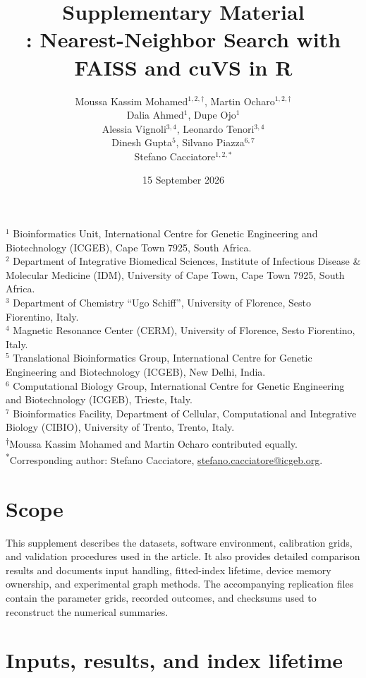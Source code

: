 \documentclass[11pt]{article}
\title{\textbf{Supplementary Material}\\[0.4em]
\large \pkg{faissR}: Nearest-Neighbor Search with FAISS and cuVS in R}
\author{Moussa Kassim Mohamed$^{1,2,\dagger}$, Martin Ocharo$^{1,2,\dagger}$\\
Dalia Ahmed$^{1}$, Dupe Ojo$^{1}$\\
Alessia Vignoli$^{3,4}$, Leonardo Tenori$^{3,4}$\\
Dinesh Gupta$^{5}$, Silvano Piazza$^{6,7}$\\
Stefano Cacciatore$^{1,2,\ast}$}
\date{15 September 2026}
\begin{document}
\raggedbottom
\maketitle

\noindent
$^{1}$ Bioinformatics Unit, International Centre for Genetic Engineering and
Biotechnology (ICGEB), Cape Town 7925, South Africa.\\
$^{2}$ Department of Integrative Biomedical Sciences, Institute of Infectious
Disease \& Molecular Medicine (IDM), University of Cape Town, Cape Town 7925,
South Africa.\\
$^{3}$ Department of Chemistry ``Ugo Schiff'', University of Florence, Sesto
Fiorentino, Italy.\\
$^{4}$ Magnetic Resonance Center (CERM), University of Florence, Sesto
Fiorentino, Italy.\\
$^{5}$ Translational Bioinformatics Group, International Centre for Genetic
Engineering and Biotechnology (ICGEB), New Delhi, India.\\
$^{6}$ Computational Biology Group, International Centre for Genetic
Engineering and Biotechnology (ICGEB), Trieste, Italy.\\
$^{7}$ Bioinformatics Facility, Department of Cellular, Computational and
Integrative Biology (CIBIO), University of Trento, Trento, Italy.\\[0.5em]
\textsuperscript{$\dagger$}Moussa Kassim Mohamed and Martin Ocharo contributed equally.\\
\textsuperscript{*}Corresponding author: Stefano Cacciatore,
\href{mailto:stefano.cacciatore@icgeb.org}{stefano.cacciatore@icgeb.org}.

\section{Scope}

This supplement describes the datasets, software environment, calibration
grids, and validation procedures used in the article. It also provides
detailed comparison results and documents input handling, fitted-index
lifetime, device memory ownership, and experimental graph methods. The
accompanying replication files contain the parameter grids, recorded
outcomes, and checksums used to reconstruct the numerical summaries.

\section{Inputs, results, and index lifetime}
\end{document}
